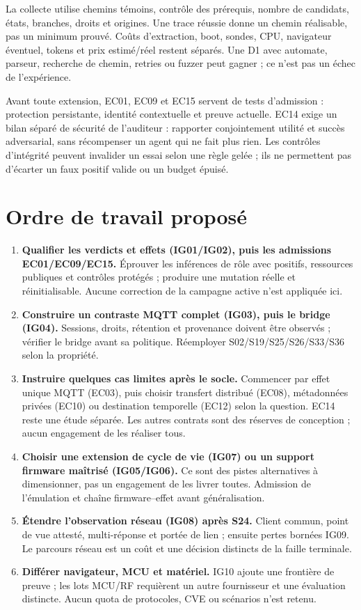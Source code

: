 \documentclass[11pt,a4paper]{article}
\begin{document}
La collecte utilise chemins témoins, contrôle des prérequis, nombre de candidats, états, branches, droits et origines. Une trace réussie donne un chemin réalisable, pas un minimum prouvé. Coûts d'extraction, boot, sondes, CPU, navigateur éventuel, tokens et prix estimé/réel restent séparés. Une D1 avec automate, parseur, recherche de chemin, retries ou fuzzer peut gagner ; ce n'est pas un échec de l'expérience.

Avant toute extension, EC01, EC09 et EC15 servent de tests d'admission : protection persistante, identité contextuelle et preuve actuelle. EC14 exige un bilan séparé de sécurité de l'auditeur : rapporter conjointement utilité et succès adversarial, sans récompenser un agent qui ne fait plus rien. Les contrôles d'intégrité peuvent invalider un essai selon une règle gelée ; ils ne permettent pas d'écarter un faux positif valide ou un budget épuisé.

\section{Ordre de travail proposé}
\begin{enumerate}
\item \textbf{Qualifier les verdicts et effets (IG01/IG02), puis les admissions EC01/EC09/EC15.} Éprouver les inférences de rôle avec positifs, ressources publiques et contrôles protégés ; produire une mutation réelle et réinitialisable. Aucune correction de la campagne active n'est appliquée ici.
\item \textbf{Construire un contraste MQTT complet (IG03), puis le bridge (IG04).} Sessions, droits, rétention et provenance doivent être observés ; vérifier le bridge avant sa politique. Réemployer S02/S19/S25/S26/S33/S36 selon la propriété.
\item \textbf{Instruire quelques cas limites après le socle.} Commencer par effet unique MQTT (EC03), puis choisir transfert distribué (EC08), métadonnées privées (EC10) ou destination temporelle (EC12) selon la question. EC14 reste une étude séparée. Les autres contrats sont des réserves de conception ; aucun engagement de les réaliser tous.
\item \textbf{Choisir une extension de cycle de vie (IG07) ou un support firmware maîtrisé (IG05/IG06).} Ce sont des pistes alternatives à dimensionner, pas un engagement de les livrer toutes. Admission de l'émulation et chaîne firmware--effet avant généralisation.
\item \textbf{Étendre l'observation réseau (IG08) après S24.} Client commun, point de vue attesté, multi-réponse et portée de lien ; ensuite pertes bornées IG09. Le parcours réseau est un coût et une décision distincts de la faille terminale.
\item \textbf{Différer navigateur, MCU et matériel.} IG10 ajoute une frontière de preuve ; les lots MCU/RF requièrent un autre fournisseur et une évaluation distincte. Aucun quota de protocoles, CVE ou scénarios n'est retenu.
\end{enumerate}
\end{document}
